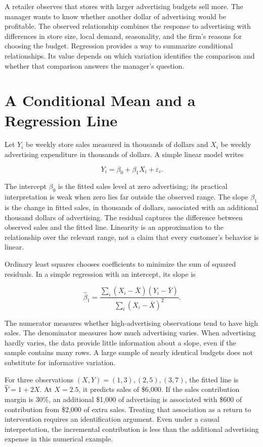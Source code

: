 \noindent A retailer observes that stores with larger advertising budgets sell
more. The manager wants to know whether another dollar of advertising
would be profitable. The observed relationship combines the response to
advertising with differences in store size, local demand, seasonality,
and the firm's reasons for choosing the budget. Regression provides a
way to summarize conditional relationships. Its value depends on which
variation identifies the comparison and whether that comparison answers
the manager's question.

\hypertarget{M03-a-conditional-mean-and-a-regression-line}{%
\section{A Conditional Mean and a Regression
Line}\label{M03-a-conditional-mean-and-a-regression-line}}

\noindent Let \(Y_i\) be weekly store sales measured in thousands of dollars and
\(X_i\) be weekly advertising expenditure in thousands of dollars. A
simple linear model writes

\[
Y_i=\beta_0+\beta_1X_i+\varepsilon_i.
\]

The intercept \(\beta_0\) is the fitted sales level at zero advertising;
its practical interpretation is weak when zero lies far outside the
observed range. The slope \(\beta_1\) is the change in fitted sales, in
thousands of dollars, associated with an additional thousand dollars of
advertising. The residual captures the difference between observed sales
and the fitted line. Linearity is an approximation to the relationship
over the relevant range, not a claim that every customer's behavior is
linear.

Ordinary least squares chooses coefficients to minimize the sum of
squared residuals. In a simple regression with an intercept, its slope
is

\[
\hat\beta_1=\frac{\sum_i(X_i-\bar X)(Y_i-\bar Y)}{\sum_i(X_i-\bar X)^2}.
\]

The numerator measures whether high-advertising observations tend to
have high sales. The denominator measures how much advertising varies.
When advertising hardly varies, the data provide little information
about a slope, even if the sample contains many rows. A large sample of
nearly identical budgets does not substitute for informative variation.

For three observations \((X,Y)=(1,3),(2,5),(3,7)\), the fitted line is
\(\hat Y=1+2X\). At \(X=2.5\), it predicts sales of \$6,000. If the
sales contribution margin is 30\%, an additional \$1,000 of advertising
is associated with \$600 of contribution from \$2,000 of extra sales.
Treating that association as a return to intervention requires an
identification argument. Even under a causal interpretation, the
incremental contribution is less than the additional advertising expense
in this numerical example.

